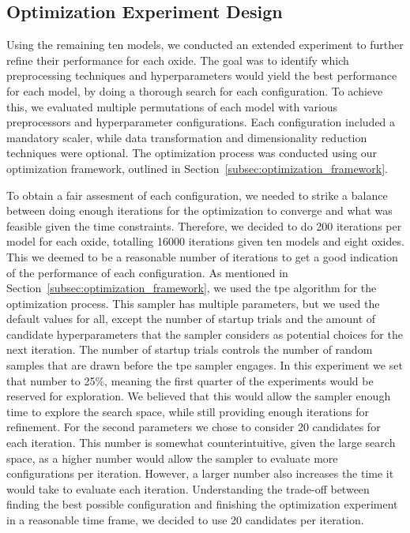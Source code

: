 \subsection{Optimization Experiment Design}\label{subsec:optimization_experiment_design}
Using the remaining ten models, we conducted an extended experiment to further refine their performance for each oxide. 
The goal was to identify which preprocessing techniques and hyperparameters would yield the best performance for each model, by doing a thorough search for each configuration.
To achieve this, we evaluated multiple permutations of each model with various preprocessors and hyperparameter configurations. 
Each configuration included a mandatory scaler, while data transformation and dimensionality reduction techniques were optional.
The optimization process was conducted using our optimization framework, outlined in Section~\ref{subsec:optimization_framework}.

To obtain a fair assesment of each configuration, we needed to strike a balance between doing enough iterations for the optimization to converge and what was feasible given the time constraints.
Therefore, we decided to do 200 iterations per model for each oxide, totalling 16000 iterations given ten models and eight oxides. 
This we deemed to be a reasonable number of iterations to get a good indication of the performance of each configuration.
As mentioned in Section~\ref{subsec:optimization_framework}, we used the \gls{tpe} algorithm for the optimization process.
This sampler has multiple parameters, but we used the default values for all, except the number of startup trials and the amount of candidate hyperparameters that the sampler considers as potential choices for the next iteration.
The number of startup trials controls the number of random samples that are drawn before the \gls{tpe} sampler engages.
In this experiment we set that number to 25\%, meaning the first quarter of the experiments would be reserved for exploration.
We believed that this would allow the sampler enough time to explore the search space, while still providing enough iterations for refinement.
For the second parameters we chose to consider 20 candidates for each iteration.
This number is somewhat counterintuitive, given the large search space, as a higher number would allow the sampler to evaluate more configurations per iteration.
However, a larger number also increases the time it would take to evaluate each iteration.
Understanding the trade-off between finding the best possible configuration and finishing the optimization experiment in a reasonable time frame, we decided to use 20 candidates per iteration.
